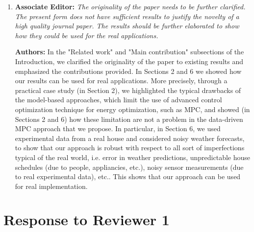 \documentclass{article}
\begin{document}
\begin{enumerate}
	\item \textbf{Associate Editor:} \textit{The originality of the paper needs to be further clarified. The present form does not have sufficient results to justify the novelty of a high quality journal paper. The results should be further elaborated to show how they could be used for the real applications.}

	\textbf{Authors:} In the "Related work" and "Main contribution" subsections of the Introduction, we clarified the originality of the paper to existing results and emphasized the contributions provided. In Sections 2 and 6 we showed how our results can be used for real applications. More precisely, through a practical case study (in Section 2), we highlighted the typical drawbacks of the model-based approaches, which limit the use of advanced control optimization technique for energy optimization, such as MPC, and showed (in Sections 2 and 6) how these limitation are not a problem in the data-driven MPC approach that we propose. In particular, in Section 6, we used experimental data from a real house and considered noisy weather forecasts, to show that our approach is robust with respect to all sort of imperfections typical of the real world, i.e. error in weather predictions, unpredictable house schedules (due to people, appliancies, etc.), noisy sensor measurements (due to real experimental data), etc.. This shows that our approach can be used for real implementation.

\end{enumerate}



\section{Response to Reviewer 1}
\end{document}
